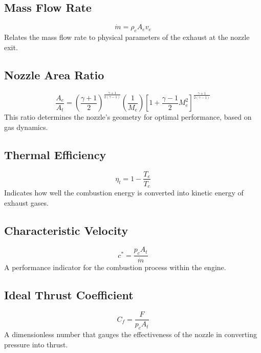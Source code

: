 \documentclass[12pt]{report}
\begin{document}
\subsection{Mass Flow Rate}
\begin{equation}
\dot{m} = \rho_e A_e v_e \label{eq:mass_flow}
\end{equation}
Relates the mass flow rate to physical parameters of the exhaust at the nozzle exit.

\subsection{Nozzle Area Ratio}
\begin{equation}
\frac{A_e}{A_t} = \left(\frac{\gamma+1}{2}\right)^{\frac{\gamma+1}{2(\gamma-1)}} \left(\frac{1}{M_e}\right) \left[1 + \frac{\gamma-1}{2} M_e^2\right]^{\frac{\gamma+1}{2(\gamma-1)}} \label{eq:area_ratio}
\end{equation}
This ratio determines the nozzle's geometry for optimal performance, based on gas dynamics.

\subsection{Thermal Efficiency}
\begin{equation}
\eta_t = 1 - \frac{T_e}{T_c} \label{eq:thermal_efficiency}
\end{equation}
Indicates how well the combustion energy is converted into kinetic energy of exhaust gases.

\subsection{Characteristic Velocity}
\begin{equation}
c^* = \frac{p_c A_t}{\dot{m}} \label{eq:characteristic_velocity}
\end{equation}
A performance indicator for the combustion process within the engine.

\subsection{Ideal Thrust Coefficient}
\begin{equation}
C_f = \frac{F}{p_c A_t} \label{eq:thrust_coefficient}
\end{equation}
A dimensionless number that gauges the effectiveness of the nozzle in converting pressure into thrust.
\end{document}
